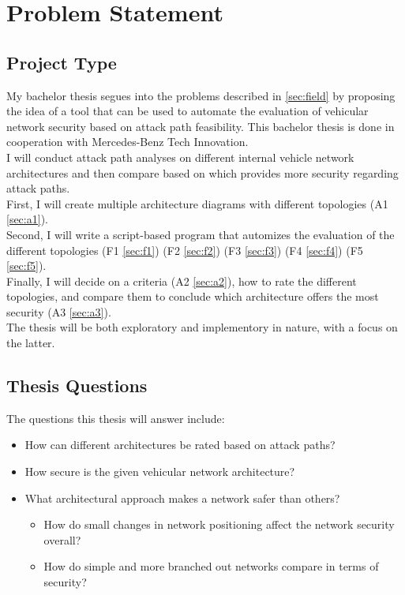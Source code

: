 
\chapter{Problem Statement}
\label{sec:problem}

\section{Project Type}\label{sec:type}

My bachelor thesis segues into the problems described in \ref{sec:field} by proposing the idea of a tool that can be used to automate the evaluation of vehicular network security based on \gls{attack path} feasibility.
This bachelor thesis is done in cooperation with Mercedes-Benz Tech Innovation.\\

I will conduct attack path analyses on different internal vehicle network architectures and then compare based on which provides more security regarding attack paths.\\

First, I will create multiple architecture diagrams with different topologies (A1 \ref{sec:a1}).\\
Second, I will write a script-based program that automizes the evaluation of the different topologies 
(F1 \ref{sec:f1})
(F2 \ref{sec:f2})
(F3 \ref{sec:f3})
(F4 \ref{sec:f4})
(F5 \ref{sec:f5}).\\
Finally, I will decide on a criteria (A2 \ref{sec:a2}), how to rate the different topologies, and compare them to conclude which architecture offers the most security (A3 \ref{sec:a3}).\\

The thesis will be both exploratory and implementory in nature, with a focus on the latter.


\section{Thesis Questions}\label{sec:thesis-questions}

The questions this thesis will answer include:

\begin{itemize}
    \item How can different architectures be rated based on attack paths?
    \item How secure is the given vehicular network architecture?
    \item What architectural approach makes a network safer than others?
    \begin{itemize}
        \item How do small changes in network positioning affect the network security overall?
        \item How do simple and more branched out networks compare in terms of security?
    \end{itemize}
\end{itemize}



